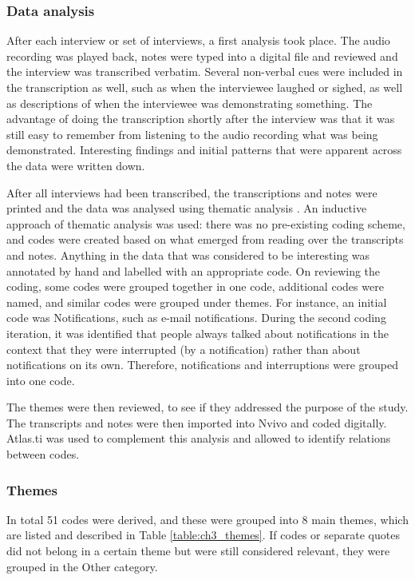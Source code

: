 \subsubsection{Data analysis}
After each interview or set of interviews, a first analysis took place. The audio recording was played back, notes were typed into a digital file and reviewed and the interview was transcribed verbatim. Several non-verbal cues were included in the transcription as well, such as when the interviewee laughed or sighed, as well as descriptions of when the interviewee was demonstrating something. The advantage of doing the transcription shortly after the interview was that it was still easy to remember from listening to the audio recording what was being demonstrated. Interesting findings and initial patterns that were apparent across the data were written down. 

After all interviews had been transcribed, the transcriptions and notes were printed and the data was analysed using thematic analysis \citep{Braun2006}. An inductive approach of thematic analysis was used: there was no pre-existing coding scheme, and codes were created based on what emerged from reading over the transcripts and notes. Anything in the data that was considered to be interesting was annotated by hand and labelled with an appropriate code. On reviewing the coding, some codes were grouped together in one code, additional codes were named, and similar codes were grouped under themes. For instance, an initial code was Notifications, such as e-mail notifications. During the second coding iteration, it was identified that people always talked about notifications in the context that they were interrupted (by a notification) rather than about notifications on its own. Therefore, notifications and interruptions were grouped into one code. 

The themes were then reviewed, to see if they addressed the purpose of the study. The transcripts and notes were then imported into Nvivo and coded digitally. Atlas.ti was used to complement this analysis and allowed to identify relations between codes. 

\subsubsection{Themes}
In total 51 codes were derived, and these were grouped into 8 main themes, which are listed and described in Table \ref{table:ch3_themes}. If codes or separate quotes did not belong in a certain theme but were still considered relevant, they were grouped in the Other category. 

